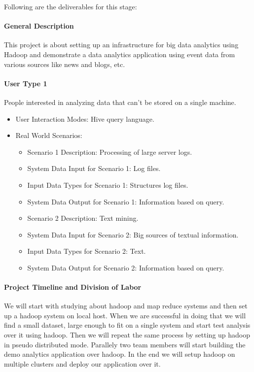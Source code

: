 Following are the deliverables for this stage:

\paragraph{General Description}
This project is about setting up an infrastructure for big data analytics using
Hadoop and demonstrate a data analytics application using event data from
various sources like news and blogs, etc. 

\paragraph{User Type 1}

People interested in analyzing data that can't be stored on a single machine.

\begin{itemize}
\item User Interaction Modes: Hive query language.
\item Real World Scenarios:
  \begin{itemize}
  \item Scenario 1 Description: Processing of large server logs.
  \item System Data Input for Scenario 1: Log files.
  \item Input Data Types for Scenario 1: Structures log files.
  \item System Data Output for Scenario 1: Information based on query.
  \item Scenario 2 Description: Text mining.
  \item System Data Input for Scenario 2: Big sources of textual information.
  \item Input Data Types for Scenario 2: Text.
  \item System Data Output for Scenario 2: Information based on query.
  \end{itemize}
\end{itemize}

\paragraph{Project Timeline and Division of Labor}

We will start with studying about hadoop and map reduce systems and then  set
up a hadoop system on local host. When we are successful in doing that we will
find a small dataset, large enough to fit on a single system and start test
analysis over it using hadoop. Then we will repeat the same process by setting
up hadoop in pseudo distributed mode. Parallely two team members will start
building the demo analytics application over hadoop. In the end we will setup
hadoop on multiple clusters and deploy our application over it.

